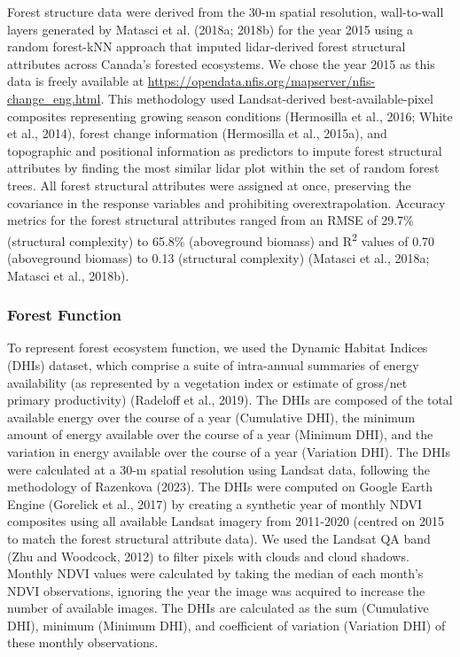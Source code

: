 \documentclass[
]{agujournal2019}
\begin{document}
Forest structure data were derived from the 30-m spatial resolution,
wall-to-wall layers generated by Matasci et al. (2018a; 2018b) for the
year 2015 using a random forest-kNN approach that imputed lidar-derived
forest structural attributes across Canada's forested ecosystems. We
chose the year 2015 as this data is freely available at
\url{https://opendata.nfis.org/mapserver/nfis-change_eng.html}. This
methodology used Landsat-derived best-available-pixel composites
representing growing season conditions (Hermosilla et al., 2016; White
et al., 2014), forest change information (Hermosilla et al., 2015a), and
topographic and positional information as predictors to impute forest
structural attributes by finding the most similar lidar plot within the
set of random forest trees. All forest structural attributes were
assigned at once, preserving the covariance in the response variables
and prohibiting overextrapolation. Accuracy metrics for the forest
structural attributes ranged from an RMSE of 29.7\% (structural
complexity) to 65.8\% (aboveground biomass) and R\textsuperscript{2}
values of 0.70 (aboveground biomass) to 0.13 (structural complexity)
(Matasci et al., 2018a; Matasci et al., 2018b).

\subsubsection{Forest Function}\label{forest-function}

To represent forest ecosystem function, we used the Dynamic Habitat
Indices (DHIs) dataset, which comprise a suite of intra-annual summaries
of energy availability (as represented by a vegetation index or estimate
of gross/net primary productivity) (Radeloff et al., 2019). The DHIs are
composed of the total available energy over the course of a year
(Cumulative DHI), the minimum amount of energy available over the course
of a year (Minimum DHI), and the variation in energy available over the
course of a year (Variation DHI). The DHIs were calculated at a 30-m
spatial resolution using Landsat data, following the methodology of
Razenkova (2023). The DHIs were computed on Google Earth Engine
(Gorelick et al., 2017) by creating a synthetic year of monthly NDVI
composites using all available Landsat imagery from 2011-2020 (centred
on 2015 to match the forest structural attribute data). We used the
Landsat QA band (Zhu and Woodcock, 2012) to filter pixels with clouds
and cloud shadows. Monthly NDVI values were calculated by taking the
median of each month's NDVI observations, ignoring the year the image
was acquired to increase the number of available images. The DHIs are
calculated as the sum (Cumulative DHI), minimum (Minimum DHI), and
coefficient of variation (Variation DHI) of these monthly observations.
\end{document}

